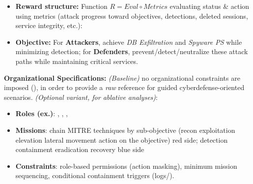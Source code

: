 \begin{itemize}
  \item \textbf{Reward structure:} Function $R = Eval \circ Metrics$ evaluating status \& action using metrics (attack progress toward objectives, detections, deleted sessions, service integrity, etc.):
  \item \textbf{Objective:} For \textbf{Attackers}, achieve \emph{DB Exfiltration} and \emph{Spyware PS} while minimizing detection; for \textbf{Defenders}, prevent/detect/neutralize these attack paths while maintaining critical services.
\end{itemize}

\medskip
\textbf{Organizational Specifications:} \emph{(Baseline)} no organizational constraints are imposed (), in order to provide a \emph{raw} reference for guided cyberdefense-oriented scenarios. \emph{(Optional variant, for ablative analyses)}:
\begin{itemize}
  \item \textbf{Roles (ex.)}: , , , 
  \item \textbf{Missions}: chain MITRE techniques by sub-objective (recon \textrightarrow{} exploitation \textrightarrow{} elevation \textrightarrow{} lateral movement \textrightarrow{} action on the objective) red side; detection \textrightarrow{} containment \textrightarrow{} eradication \textrightarrow{} recovery blue side
  \item \textbf{Constraints}: role-based permissions (action masking), minimum mission sequencing, conditional containment triggers (logs/).
\end{itemize}

